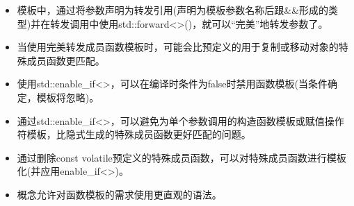 
\begin{itemize}
\item 
模板中，通过将参数声明为转发引用(声明为模板参数名称后跟\&\&形成的类型)并在转发调用中使用std::forward<>()，就可以“完美”地转发参数了。

\item 
当使用完美转发成员函数模板时，可能会比预定义的用于复制或移动对象的特殊成员函数更匹配。

\item 
使用std::enable\_if<>，可以在编译时条件为false时禁用函数模板(当条件确定，模板将忽略)。

\item 
通过std::enable\_if<>，可以避免为单个参数调用的构造函数模板或赋值操作符模板，比隐式生成的特殊成员函数更好匹配的问题。

\item 
通过删除const volatile预定义的特殊成员函数，可以对特殊成员函数进行模板化(并应用enable\_if<>)。

\item 
概念允许对函数模板的需求使用更直观的语法。
\end{itemize}